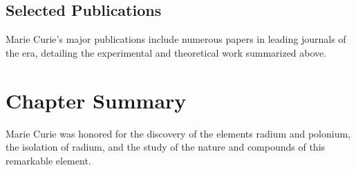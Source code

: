 \subsection*{Selected Publications}

Marie Curie's major publications include numerous papers in leading journals of the era, detailing the experimental and theoretical work summarized above.

\clearpage

\section*{Chapter Summary}

Marie Curie was honored for the discovery of the elements radium and polonium, the isolation of radium, and the study of the nature and compounds of this remarkable element.
